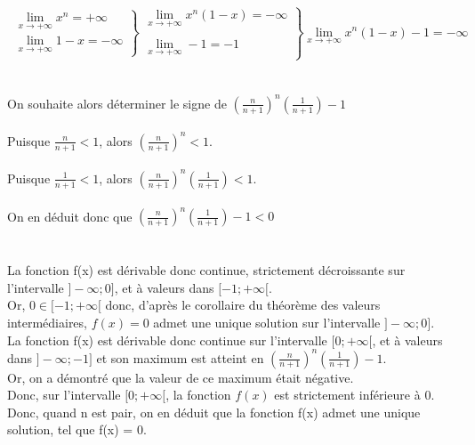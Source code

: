 \documentclass{article}
\begin{document}
\begin{exo2}
    \[\
     \left.
        \begin{array}{ll}
            \lim\limits_{x \rightarrow +\infty} x^{n} = +\infty \\
            \lim\limits_{x \rightarrow +\infty} 1-x = -\infty
        \end{array}
    \right \} \left.
        \begin{array}{ll}
        \lim\limits_{x \rightarrow +\infty} x^{n}(1-x) = -\infty \\ \\
            \lim\limits_{x \rightarrow +\infty} -1 = -1
        \end{array}
    \right \}\lim\limits_{x \rightarrow +\infty} x^{n}(1-x) -1 = -\infty
    \] \\ \\ 
        On souhaite alors déterminer le signe de $(\frac{n}{n+1})^{n}(\frac{1}{n+1})-1$ \\ \\
        Puisque $\frac{n}{n+1}<1$, alors $(\frac{n}{n+1})^{n}<1$. \\ \\
        Puisque $\frac{1}{n+1}<1$, alors $(\frac{n}{n+1})^{n}(\frac{1}{n+1})<1$.\\ \\ 
        On en déduit donc que $(\frac{n}{n+1})^{n}(\frac{1}{n+1})-1 < 0$\\ \\ \\
        La fonction f(x) est dérivable donc continue, strictement décroissante sur l'intervalle $]-\infty;0]$, et à valeurs dans $[-1;+\infty[$. \\
        Or, $0\in[-1;+\infty[$ donc, d'après le corollaire du théorème des valeurs intermédiaires, $f(x) = 0$ admet une unique solution sur l'intervalle $]-\infty;0]$. \\
        La fonction f(x) est dérivable donc continue sur l'intervalle $[0;+\infty[$, et à valeurs dans $]-\infty;-1]$ et son maximum est atteint en  $(\frac{n}{n+1})^{n}(\frac{1}{n+1})-1$. \\Or, on a démontré que la valeur de ce maximum était négative. \\ Donc, sur l'intervalle $[0;+\infty[$, la fonction $f(x)$ est strictement inférieure à $0$.\\
        Donc, quand n est pair, on en déduit que la fonction f(x) admet une unique solution, tel que f(x) = 0. \\
        

\end{exo2}
\end{document}
